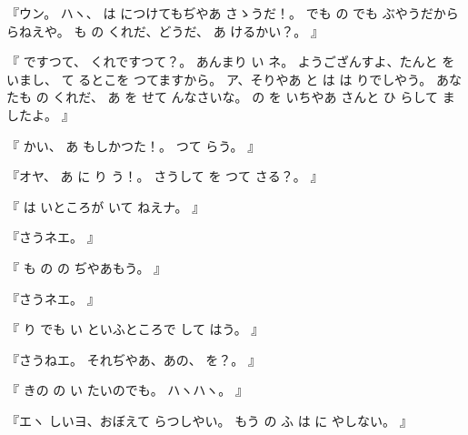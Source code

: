 『ウン。
ハヽ、
は
につけてもぢやあ
さゝうだ！。
でも
の
でも
ぶやうだから
らねえや。
も
の
くれだ、どうだ、
あ
けるかい？。
』

『
ですつて、
くれですつて？。
あんまり
い
ネ。
ようござんすよ、たんと
を
いまし、
て
るとこを
つてますから。
ア、そりやあ
と
は
は
りでしやう。
あなたも
の
くれだ、
あ
を
せて
んなさいな。
の
を
いちやあ
さんと
ひ
らして
ましたよ。
』

『
かい、
あ
もしかつた！。
つて
らう。
』

『オヤ、
あ
に
り
う！。
さうして
を
つて
さる？。
』

『
は
いところが
いて
ねえナ。
』

『さうネエ。
』

『
も
の
の
ぢやあもう。
』

『さうネエ。
』

『
り
でも
い
といふところで
して%
はう。
』

『さうねエ。
それぢやあ、あの、
を？。
』

『
きの
の
い
たいのでも。
ハヽハヽ。
』

『エヽ
しいヨ、おぼえて
らつしやい。
もう
の
ふ
は
に
やしない。
』

